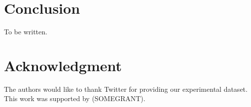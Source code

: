 \documentclass[conference]{IEEEtran}
\begin{document}
%
%

\section{Conclusion}
To be written.


\section*{Acknowledgment}
The authors would like to thank Twitter for providing our experimental dataset. This work was supported by (SOMEGRANT).




\end{document}

